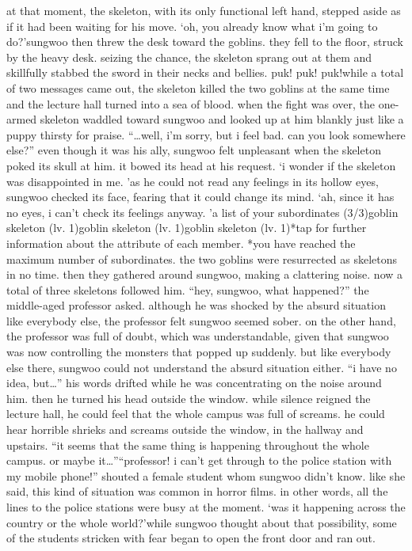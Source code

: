  at that moment, the skeleton, with its only functional left hand, stepped aside as if it had been waiting for his move.
‘oh, you already know what i’m going to do?’sungwoo then threw the desk toward the goblins.
 they fell to the floor, struck by the heavy desk.
seizing the chance, the skeleton sprang out at them and skillfully stabbed the sword in their necks and bellies.
puk! puk! puk!while a total of two messages came out, the skeleton killed the two goblins at the same time and the lecture hall turned into a sea of blood.
 when the fight was over, the one-armed skeleton waddled toward sungwoo and looked up at him blankly just like a puppy thirsty for praise.
“…well, i’m sorry, but i feel bad.
 can you look somewhere else?”
even though it was his ally, sungwoo felt unpleasant when the skeleton poked its skull at him.
it bowed its head at his request.
‘i wonder if the skeleton was disappointed in me.
’as he could not read any feelings in its hollow eyes, sungwoo checked its face, fearing that it could change its mind.
‘ah, since it has no eyes, i can’t check its feelings anyway.
’a list of your subordinates (3/3)goblin skeleton (lv.
1)goblin skeleton (lv.
1)goblin skeleton (lv.
1)*tap for further information about the attribute of each member.
*you have reached the maximum number of subordinates.
the two goblins were resurrected as skeletons in no time.
 then they gathered around sungwoo, making a clattering noise.
 now a total of three skeletons followed him.
“hey, sungwoo, what happened?” the middle-aged professor asked.
 although he was shocked by the absurd situation like everybody else, the professor felt sungwoo seemed sober.
on the other hand, the professor was full of doubt, which was understandable, given that sungwoo was now controlling the monsters that popped up suddenly.
 but like everybody else there, sungwoo could not understand the absurd situation either.
“i have no idea, but…” his words drifted while he was concentrating on the noise around him.
 then he turned his head outside the window.
while silence reigned the lecture hall, he could feel that the whole campus was full of screams.
 he could hear horrible shrieks and screams outside the window, in the hallway and upstairs.
“it seems that the same thing is happening throughout the whole campus.
 or maybe it…”“professor! i can’t get through to the police station with my mobile phone!” shouted a female student whom sungwoo didn’t know.
like she said, this kind of situation was common in horror films.
 in other words, all the lines to the police stations were busy at the moment.
‘was it happening across the country or the whole world?’while sungwoo thought about that possibility, some of the students stricken with fear began to open the front door and ran out.
